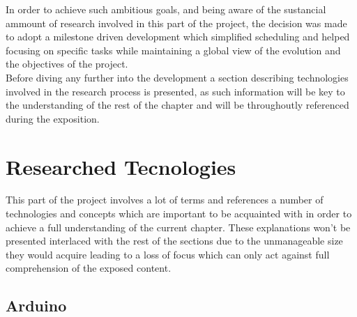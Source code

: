 
	In order to achieve such ambitious goals, and being aware of the sustancial ammount of research involved in this part of the project, the decision was made to adopt a milestone driven development which simplified scheduling and helped focusing on specific tasks while maintaining a global view of the evolution and the objectives of the project.\\


	Before diving any further into the development a section describing technologies involved in the research process is presented, as such information will be key to the understanding of the rest of the chapter and will be throughoutly referenced during the exposition.

	\section{Researched Tecnologies}


	This part of the project involves a lot of terms and references a number of technologies and concepts which are important to be acquainted with in order to achieve a full understanding of the current chapter. These explanations won't be presented interlaced with the rest of the sections due to the unmanageable size they would acquire leading to a loss of focus which can only act against full comprehension of the exposed content.

		\subsection{Arduino}
